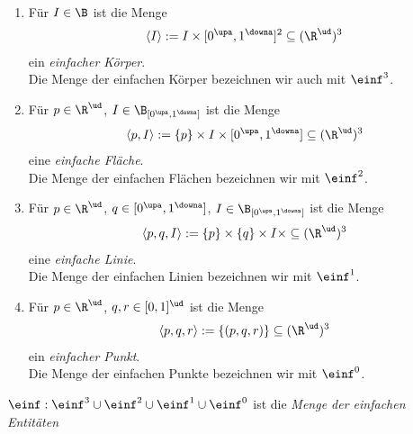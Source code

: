 \begin{dfn}\ %
    \begin{enumerate}
        \item Für $I \in \B$ ist die Menge
            \begin{align*}
                \langle I \rangle := I \times [0^\upa, 1^\downa]^2 \subseteq (\R^\ud)^3
            \end{align*}
            ein \emph{einfacher Körper}.\\ 
            Die Menge der einfachen Körper bezeichnen wir auch mit $\einf^3$.
        \item Für $p \in \R^\ud$, $I \in \B_{[0^\upa, 1^\downa]}$ ist die Menge
            \begin{align*}
                \langle p,I \rangle := \{p\} \times I \times [0^\upa, 1^\downa] \subseteq (\R^\ud)^3
            \end{align*}
            eine \emph{einfache Fläche}.\\
            Die Menge der einfachen Flächen bezeichnen wir mit $\einf^2$.
        \item Für $p \in \R^\ud$, $q \in [0^\upa,1^\downa]$, $I \in \B_{[0^\upa, 1^\downa]}$ ist die Menge
            \begin{align*}
                \langle p,q,I \rangle := \{p\} \times \{q\} \times I \times \subseteq (\R^\ud)^3
            \end{align*}
            eine \emph{einfache Linie}.\\
            Die Menge der einfachen Linien bezeichnen wir mit $\einf^1$.
        \item Für $p \in \R^\ud$, $q,r \in [0,1]^\ud$ ist die Menge
            \begin{align*}
                \langle p,q,r \rangle := \{(p,q,r)\} \subseteq (\R^\ud)^3
            \end{align*}
            ein \emph{einfacher Punkt}.\\
            Die Menge der einfachen Punkte bezeichnen wir mit $\einf^0$.
    \end{enumerate}
    $\einf : \einf^3 \cup \einf^2 \cup \einf^1 \cup \einf^0$ ist die \emph{Menge der einfachen Entitäten}
\end{dfn}

